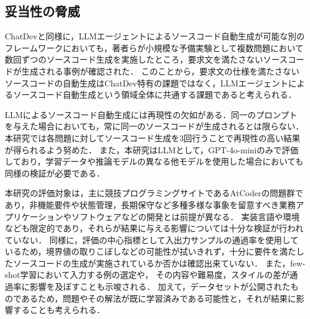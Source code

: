 \documentclass[submit,techrep,noauthor]{ipsj}
\newcommand{\memo}[1]{\colorbox{magenta!30}{{\bf MEMO}:}{\color{red!50} {\textbf{[#1]}}}}
\begin{document}
\subsection{妥当性の脅威}
ChatDevと同様に，LLMエージェントによるソースコード自動生成が可能な別のフレームワークにおいても\cite{kiro}，著者らが小規模な予備実験として複数問題において数回ずつのソースコード生成を実施したところ，要求文を満たさないソースコードが生成される事例が確認された．
このことから，要求文の仕様を満たさないソースコードの自動生成はChatDev特有の課題ではなく，LLMエージェントによるソースコード自動生成という領域全体に共通する課題であると考えられる．

LLMによるソースコード自動生成には再現性の欠如がある．同一のプロンプトを与えた場合においても，常に同一のソースコードが生成されるとは限らない．本研究では各問題に対してソースコード生成を3回行うことで再現性の高い結果が得られるよう努めた．
また，本研究はLLMとして，GPT-4o-miniのみで評価しており，学習データや推論モデルの異なる他モデルを使用した場合においても同様の検証が必要である．

本研究の評価対象は，主に競技プログラミングサイトであるAtCoderの問題群であり，非機能要件や状態管理，長期保守など多種多様な事象を留意すべき業務アプリケーションやソフトウェアなどの開発とは前提が異なる．
実装言語や環境なども限定的であり，それらが結果に与える影響については十分な検証が行われていない．
同様に，評価の中心指標として入出力サンプルの通過率を使用しているため，境界値の取りこぼしなどの可能性が拭いきれず，十分に要件を満たしたソースコードの生成が実施されているか否かは確認出来ていない．
また，few-shot学習において入力する例の選定や，
その内容や難易度，スタイルの差が通過率に影響を及ぼすことも示唆される．
加えて，データセットが公開されたものであるため，問題やその解法が既に学習済みである可能性と，それが結果に影響することも考えられる．
\end{document}

